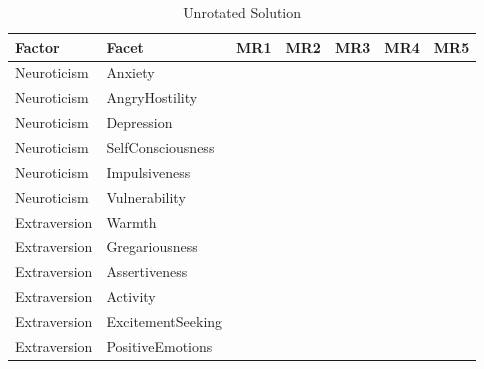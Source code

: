 \documentclass{article}\usepackage[]{graphicx}\usepackage[]{color}
\begin{document}
\begin{table}
\caption{\label{tab:unnamed-chunk-11}Unrotated Solution}
\centering
\begin{tabular}[t]{lllllll}
\toprule
Factor & Facet & MR1 & MR2 & MR3 & MR4 & MR5\\
\midrule
Neuroticism & Anxiety & \cellcolor{white}{0.26} & \cellcolor{yellow}{0.78} & \cellcolor{white}{0.25} & \cellcolor{white}{0.09} & \cellcolor{white}{0}\\
Neuroticism & AngryHostility & \cellcolor{white}{0.03} & \cellcolor{white}{0.47} & \cellcolor{white}{0.12} & \cellcolor{yellow}{0.69} & \cellcolor{white}{0.02}\\
Neuroticism & Depression & \cellcolor{white}{0.08} & \cellcolor{yellow}{0.87} & \cellcolor{white}{0.05} & \cellcolor{white}{0.12} & \cellcolor{white}{-0.05}\\
Neuroticism & SelfConsciousness & \cellcolor{white}{0.17} & \cellcolor{yellow}{0.72} & \cellcolor{white}{0.28} & \cellcolor{white}{-0.04} & \cellcolor{white}{0.03}\\
Neuroticism & Impulsiveness & \cellcolor{white}{0.29} & \cellcolor{white}{0.43} & \cellcolor{white}{-0.22} & \cellcolor{white}{0.31} & \cellcolor{white}{-0.18}\\
\addlinespace
Neuroticism & Vulnerability & \cellcolor{white}{0.05} & \cellcolor{yellow}{0.81} & \cellcolor{white}{0.12} & \cellcolor{white}{0.07} & \cellcolor{white}{-0.11}\\
Extraversion & Warmth & \cellcolor{yellow}{0.73} & \cellcolor{white}{-0.14} & \cellcolor{white}{-0.24} & \cellcolor{white}{-0.01} & \cellcolor{white}{-0.38}\\
Extraversion & Gregariousness & \cellcolor{yellow}{0.53} & \cellcolor{white}{-0.2} & \cellcolor{white}{-0.27} & \cellcolor{white}{0.19} & \cellcolor{white}{-0.34}\\
Extraversion & Assertiveness & \cellcolor{white}{0.47} & \cellcolor{white}{-0.42} & \cellcolor{white}{-0.04} & \cellcolor{white}{0.38} & \cellcolor{white}{-0.12}\\
Extraversion & Activity & \cellcolor{yellow}{0.62} & \cellcolor{white}{-0.21} & \cellcolor{white}{0.02} & \cellcolor{white}{0.38} & \cellcolor{white}{-0.02}\\
\addlinespace
Extraversion & ExcitementSeeking & \cellcolor{white}{0.42} & \cellcolor{white}{-0.07} & \cellcolor{white}{-0.35} & \cellcolor{white}{0.22} & \cellcolor{white}{-0.01}\\
Extraversion & PositiveEmotions & \cellcolor{yellow}{0.7} & \cellcolor{white}{-0.3} & \cellcolor{white}{-0.32} & \cellcolor{white}{-0.01} & \cellcolor{white}{-0.08}\\

\end{tabular}
\end{table}
\end{document}
